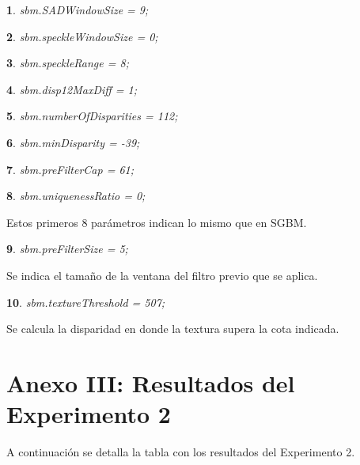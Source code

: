 \documentclass[11pt,a4paper,titlepage]{article}
\newtheorem{mytheorem}{}
\newenvironment{theorem}%
  {\begin{lrbox}{\thmbox}%
   \begin{minipage}{\dimexpr\linewidth-2\fboxsep}
   \begin{mytheorem}}%
  {\end{mytheorem}%
   \end{minipage}%
   \end{lrbox}%
   \begin{trivlist}
     \item[]\colorbox{lightgray}{\usebox\thmbox}
   \end{trivlist}}
\begin{document}
\begin{theorem}
sbm.SADWindowSize = 9;
\end{theorem}
\begin{theorem}
sbm.speckleWindowSize = 0;
\end{theorem}
\begin{theorem}
sbm.speckleRange = 8;
\end{theorem}
\begin{theorem}
sbm.disp12MaxDiff = 1;
\end{theorem}
\begin{theorem}
sbm.numberOfDisparities = 112;
\end{theorem}
\begin{theorem}
sbm.minDisparity = -39;
\end{theorem}
\begin{theorem}
sbm.preFilterCap = 61;
\end{theorem}
\begin{theorem}
sbm.uniquenessRatio = 0;
\end{theorem}

Estos primeros 8 parámetros indican lo mismo que en SGBM.

\begin{theorem}
sbm.preFilterSize = 5;
\end{theorem}

Se indica el tamaño de la ventana del filtro previo que se aplica.

\begin{theorem}
sbm.textureThreshold = 507;
\end{theorem}

Se calcula la disparidad en donde la textura supera la cota indicada.

\newpage

\section{Anexo III: Resultados del Experimento 2}

A continuación se detalla la tabla con los resultados del Experimento 2.

\end{document}
